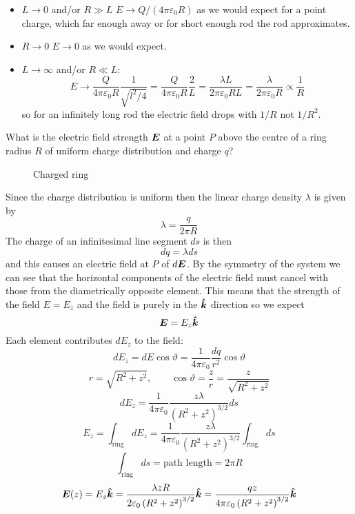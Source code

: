 \documentclass{article}
\begin{document}
    \begin{itemize}
        \item \(L\to 0\) and/or \(R \gg L\) \(E\to Q/(4\pi\varepsilon_0R)\) as we would expect for a point charge, which far enough away or for short enough rod the rod approximates.
        \item \(R\to 0\) \(E\to 0\) as we would expect.
        \item \(L\to \infty\) and/or \(R \ll L\):
        \[E\to \frac{Q}{4\pi\varepsilon_0R}\frac{1}{\sqrt{l^2/4}} = \frac{Q}{4\pi\varepsilon_0R}\frac{2}{L} = \frac{\lambda L}{2\pi\varepsilon_0 RL} = \frac{\lambda}{2\pi\varepsilon_0R}\propto\frac{1}{R}\]
        so for an infinitely long rod the electric field drops with \(1/R\) not \(1/R^2\).
    \end{itemize}
    
    \example
    What is the electric field strength \(\bm{E}\) at a point \(P\) above the centre of a ring radius \(R\) of uniform charge distribution and charge \(q\)?
    \begin{figure}[ht]
        \centering
        \caption{Charged ring}
        \label{fig:charged ring}
    \end{figure}
    Since the charge distribution is uniform then the linear charge density \(\lambda\) is given by
    \[\lambda = \frac{q}{2\pi R}\]
    The charge of an infinitesimal line segment \(ds\) is then
    \[dq = \lambda ds\]
    and this causes an electric field at \(P\) of \(d\bm{E}\).
    By the symmetry of the system we can see that the horizontal components of the electric field must cancel with those from the diametrically opposite element.
    This means that the strength of the field \(E = E_z\) and the field is purely in the \(\bm{\hat{k}}\) direction so we expect
    \[\bm{E} = E_z\bm{\hat{k}}\]
    Each element contributes \(dE_z\) to the field:
    \[dE_z = dE\cos\vartheta = \frac{1}{4\pi\varepsilon_0} \frac{dq}{r^2}\cos\vartheta\]
    \[r = \sqrt{R^2 + z^2},\qquad \cos\vartheta = \frac{z}{r} = \frac{z}{\sqrt{R^2 + z^2}}\]
    \[dE_z = \frac{1}{4\pi\varepsilon_0}\frac{z\lambda}{\left(R^2 + z^2\right)^{3/2}}ds\]
    \[E_z = \int_{\text{ring}}dE_z = \frac{1}{4\pi\varepsilon_0} \frac{z\lambda}{\left(R^2 + z^2\right)^{3/2}}\int_{\text{ring}}ds\]
    \[\int_{\text{ring}}ds = \text{path length} = 2\pi R\]
    \[\bm{E}(z) = E_z\bm{\hat{k}} = \frac{\lambda z R}{2\varepsilon_0\left(R^2 + z^2\right)^{3/2}}\bm{\hat{k}} = \frac{qz}{4\pi\varepsilon_0\left(R^2 + z^2\right)^{3/2}}\bm{\hat{k}}\]
    
\end{document}
